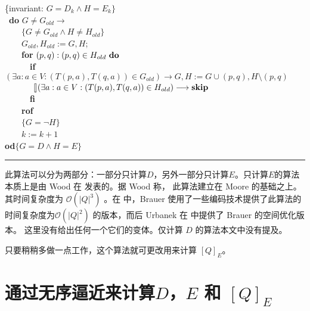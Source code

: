 \mbox{\{invariant:} $G=D_k \land H =E_k \}$\\
\mbox{ \textbf{do}} $G \not= G_{old} \longrightarrow$ \\
\mbox{　　}$\{G \not= G_{old} \land H \not= H_{old} \}$ \\
\mbox{　　}$G_{old},H_{old}:=G,H$;\\
\mbox{　　\textbf{for}} $(p,q):(p,q)\in H_{old} \mbox{ \textbf{do}}$ \\
\mbox{　　　\textbf{if}} $(\exists a:a \in V : (T(p,a),T(q,a))\in G_{old} ) \longrightarrow G,H:=G \cup {(p,q)},H \setminus {(p,q)}$ \\
\mbox{　　　} $\talloblong (\exists a:a \in V : (T(p,a),T(q,a)) \in H_{old} ) \longrightarrow \mbox{\textbf{skip}} $\\
\mbox{　　　\textbf{fi}}\\
\mbox{　　\textbf{rof}}\\
\mbox{　　}$\{G=\neg H\}$ \\
\mbox{　　}$k:=k+1$ \\
\mbox{\textbf{od}}$ \{ G=D \land H=E \}$ \\
\rule{\textwidth}{1pt}
此算法可以分为两部分：一部分只计算$D$，另外一部分只计算$E$。只计算$E$的算法本质上是由 Wood 在 \cite[pg.132]{Wood87} 发表的。据 Wood 称， 此算法建立在 Moore \cite{Moor56} 的基础之上。其时间复杂度为 $\mathcal{O}(|Q|^3)$ 。在 \cite{Brau88} 中，Brauer 使用了一些编码技术提供了此算法的时间复杂度为$\mathcal{O}(|Q|^2)$ 的版本，而后 Urbanek 在 \cite{Urba89} 中提供了 Brauer 的空间优化版本。 这里没有给出任何一个它们的变体。仅计算 $D$ 的算法本文中没有提及。

只要稍稍多做一点工作，这个算法就可更改用来计算 $[Q]_E$。

\section{通过无序逼近来计算$D$，$E$ 和 $[Q]_E$}

